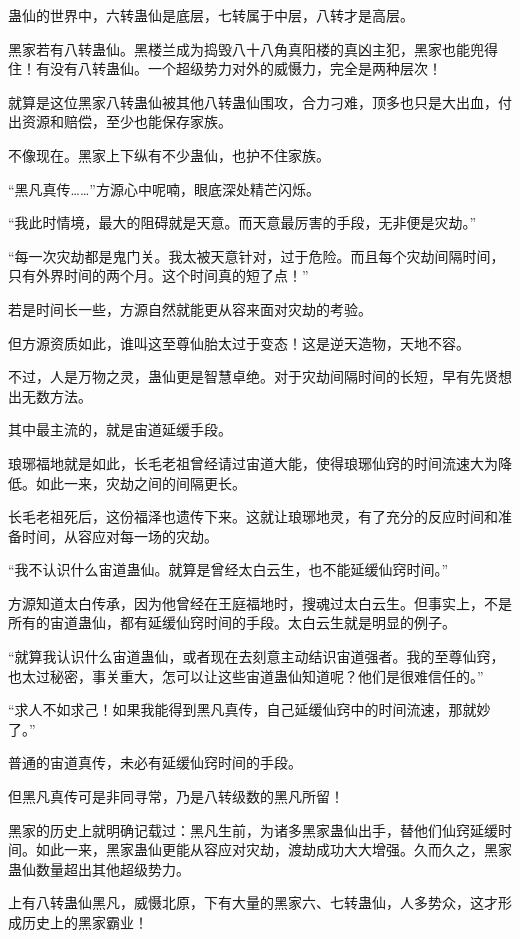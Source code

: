 \begin{this_body}
蛊仙的世界中，六转蛊仙是底层，七转属于中层，八转才是高层。

黑家若有八转蛊仙。黑楼兰成为捣毁八十八角真阳楼的真凶主犯，黑家也能兜得住！有没有八转蛊仙。一个超级势力对外的威慑力，完全是两种层次！

就算是这位黑家八转蛊仙被其他八转蛊仙围攻，合力刁难，顶多也只是大出血，付出资源和赔偿，至少也能保存家族。

不像现在。黑家上下纵有不少蛊仙，也护不住家族。

“黑凡真传……”方源心中呢喃，眼底深处精芒闪烁。

“我此时情境，最大的阻碍就是天意。而天意最厉害的手段，无非便是灾劫。”

“每一次灾劫都是鬼门关。我太被天意针对，过于危险。而且每个灾劫间隔时间，只有外界时间的两个月。这个时间真的短了点！”

若是时间长一些，方源自然就能更从容来面对灾劫的考验。

但方源资质如此，谁叫这至尊仙胎太过于变态！这是逆天造物，天地不容。

不过，人是万物之灵，蛊仙更是智慧卓绝。对于灾劫间隔时间的长短，早有先贤想出无数方法。

其中最主流的，就是宙道延缓手段。

琅琊福地就是如此，长毛老祖曾经请过宙道大能，使得琅琊仙窍的时间流速大为降低。如此一来，灾劫之间的间隔更长。

长毛老祖死后，这份福泽也遗传下来。这就让琅琊地灵，有了充分的反应时间和准备时间，从容应对每一场的灾劫。

“我不认识什么宙道蛊仙。就算是曾经太白云生，也不能延缓仙窍时间。”

方源知道太白传承，因为他曾经在王庭福地时，搜魂过太白云生。但事实上，不是所有的宙道蛊仙，都有延缓仙窍时间的手段。太白云生就是明显的例子。

“就算我认识什么宙道蛊仙，或者现在去刻意主动结识宙道强者。我的至尊仙窍，也太过秘密，事关重大，怎可以让这些宙道蛊仙知道呢？他们是很难信任的。”

“求人不如求己！如果我能得到黑凡真传，自己延缓仙窍中的时间流速，那就妙了。”

普通的宙道真传，未必有延缓仙窍时间的手段。

但黑凡真传可是非同寻常，乃是八转级数的黑凡所留！

黑家的历史上就明确记载过：黑凡生前，为诸多黑家蛊仙出手，替他们仙窍延缓时间。如此一来，黑家蛊仙更能从容应对灾劫，渡劫成功大大增强。久而久之，黑家蛊仙数量超出其他超级势力。

上有八转蛊仙黑凡，威慑北原，下有大量的黑家六、七转蛊仙，人多势众，这才形成历史上的黑家霸业！


\end{this_body}
